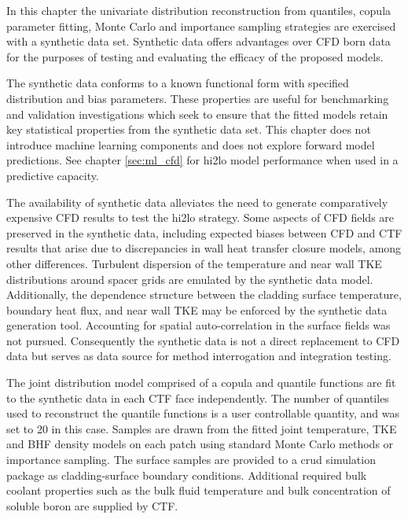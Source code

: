 
In this chapter the univariate distribution reconstruction from quantiles, copula parameter fitting, Monte Carlo and importance sampling strategies are exercised with a synthetic data set.  Synthetic data offers advantages over CFD born data for the purposes of testing and evaluating the efficacy of the proposed models.  

The synthetic data conforms to a known functional form with specified distribution and bias parameters. These properties are useful for benchmarking and validation investigations which seek to ensure that the fitted models retain key statistical properties from the synthetic data set. This chapter does not introduce machine learning components and does not explore forward model predictions.  See chapter \ref{sec:ml_cfd} for hi2lo model performance when used in a predictive capacity.

The availability of synthetic data alleviates the need to generate comparatively expensive CFD results to test the hi2lo strategy.  Some aspects of CFD fields are preserved in the synthetic data, including expected biases between CFD and CTF results that arise due to discrepancies in wall heat transfer closure models, among other differences.  Turbulent dispersion of the temperature and near wall TKE distributions around spacer grids are emulated by the synthetic data model.  Additionally, the dependence structure between the cladding surface temperature, boundary heat flux, and near wall TKE may be enforced by the synthetic data generation tool.  Accounting for spatial auto-correlation in the surface fields was not pursued.    Consequently the synthetic data is not a direct replacement to CFD data but serves as data source for method interrogation and integration testing.

The joint distribution model comprised of a copula and quantile functions are fit to the synthetic data in each CTF face independently.  The number of quantiles used to reconstruct the quantile functions is a user controllable quantity, and was set to 20 in this case.  Samples are drawn from the fitted joint temperature, TKE and BHF density models on each patch using standard Monte Carlo methods or importance sampling.  The surface samples are provided to a crud simulation package as cladding-surface boundary conditions.  Additional required bulk coolant properties such as the bulk fluid temperature and bulk concentration of soluble boron are supplied by CTF.

